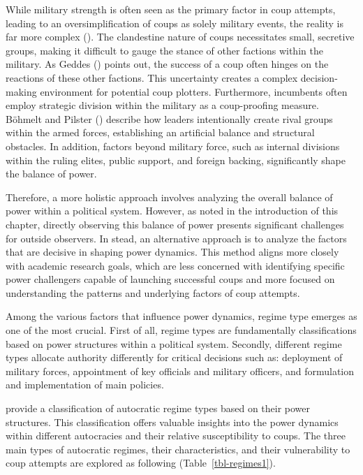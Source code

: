\documentclass[
  12pt,
]{report}
\begin{document}
While military strength is often seen as the primary factor in coup
attempts, leading to an oversimplification of coups as solely military
events, the reality is far more complex (). The clandestine nature of coups necessitates small, secretive
groups, making it difficult to gauge the stance of other factions within
the military. As Geddes () points out,
the success of a coup often hinges on the reactions of these other
factions. This uncertainty creates a complex decision-making environment
for potential coup plotters. Furthermore, incumbents often employ
strategic division within the military as a coup-proofing measure.
Böhmelt and Pilster () describe how
leaders intentionally create rival groups within the armed forces,
establishing an artificial balance and structural obstacles. In
addition, factors beyond military force, such as internal divisions
within the ruling elites, public support, and foreign backing,
significantly shape the balance of power.

Therefore, a more holistic approach involves analyzing the overall
balance of power within a political system. However, as noted in the
introduction of this chapter, directly observing this balance of power
presents significant challenges for outside observers. In stead, an
alternative approach is to analyze the factors that are decisive in
shaping power dynamics. This method aligns more closely with academic
research goals, which are less concerned with identifying specific power
challengers capable of launching successful coups and more focused on
understanding the patterns and underlying factors of coup attempts.

Among the various factors that influence power dynamics, regime type
emerges as one of the most crucial. First of all, regime types are
fundamentally classifications based on power structures within a
political system. Secondly, different regime types allocate authority
differently for critical decisions such as: deployment of military
forces, appointment of key officials and military officers, and
formulation and implementation of main policies.

provide a classification of autocratic regime types based on their power
structures. This classification offers valuable insights into the power
dynamics within different autocracies and their relative susceptibility
to coups. The three main types of autocratic regimes, their
characteristics, and their vulnerability to coup attempts are explored
as following (Table~\ref{tbl-regimes1}).
\end{document}
